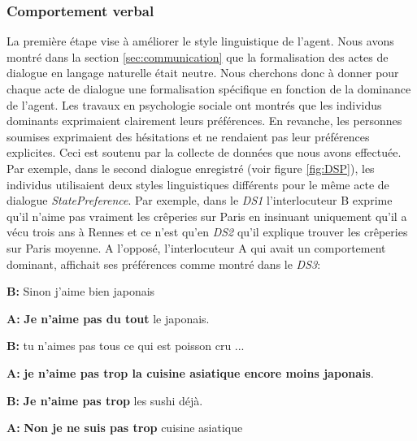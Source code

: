 		\subsubsection{Comportement verbal}
		La première étape vise à améliorer le style linguistique de l'agent. Nous avons montré dans la section \ref{sec:communication} que la formalisation des actes de dialogue en langage naturelle était neutre. 
		Nous cherchons donc à donner pour chaque acte de dialogue une formalisation spécifique en fonction de la dominance de l'agent. Les travaux en psychologie sociale ont montrés que les individus dominants exprimaient clairement leurs préférences. En revanche, les personnes soumises exprimaient des hésitations et ne rendaient pas leur préférences explicites.  Ceci est soutenu par la collecte de données que nous avons effectuée.
		Par exemple, dans le second dialogue enregistré (voir figure \ref{fig:DSP}), les individus utilisaient deux styles linguistiques différents pour le même acte de dialogue \emph{StatePreference}. Par exemple, dans le \emph{DS1} l'interlocuteur B exprime qu'il n'aime pas vraiment les crêperies sur Paris en insinuant uniquement qu'il a vécu trois ans à Rennes et ce n'est qu'en \emph{DS2} qu'il explique trouver les crêperies sur Paris moyenne.
		A l'opposé, l'interlocuteur A qui avait un comportement dominant, affichait ses préférences comme montré dans le \emph{DS3}:
	
			\begin{minipage}{\textwidth}
				{\ttfamily
		
					\begin{addmargin}[1em]{2em}%
						
						\vspace{0.5em}
					
						
							 \hspace*{3mm} \textbf{B:}  Sinon j'aime bien japonais 
						
						
							\textbf{A:} \textbf{Je n'aime pas du tout} le japonais.
						
							\hspace*{3mm} 	\textbf{B:} tu n'aimes pas tous ce qui est poisson cru ... 
						
							\textbf{A:}  \textbf{je n'aime pas trop la cuisine asiatique encore moins japonais}.
							
							\hspace*{3mm} 	\textbf{B:} \textbf{Je n'aime pas trop }les sushi déjà.
							
							\textbf{A:} \textbf{Non je ne suis pas trop} cuisine asiatique
							\vspace{1.5em}
					\end{addmargin}
				} 
			\end{minipage}

